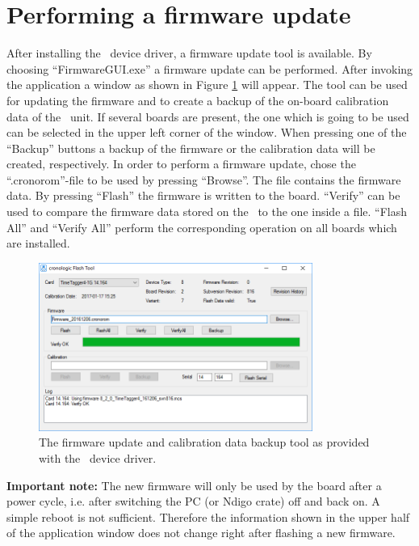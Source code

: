 	\section{Performing a firmware update}

		After installing the \deviceName\ device driver, a firmware update tool is available.
		 By choosing ``FirmwareGUI.exe'' a firmware update can be performed. 
		 After invoking the application a window as shown in Figure \ref{fig:Firmware} will appear. 
		 The tool can be used for updating the firmware and to create a backup of the on-board calibration data of the \deviceName\ unit. 
		 If several boards are present, the one which is going to be used can be selected in the upper left corner of the window. 
		 When pressing one of the ``Backup'' buttons a backup of the firmware or the calibration data will be created, respectively. 
		 In order to perform a firmware update, chose the ``.cronorom''-file to be used by pressing ``Browse''. 
		 The file contains the firmware data. By pressing ``Flash'' the firmware is written to the board. 
		 ``Verify'' can be used to compare the firmware data stored on the \deviceName\ to the one inside a file.
		 ``Flash All'' and ``Verify All'' perform the corresponding operation on all boards which are installed.\par

		\begin{figure}[ht]
			\begin{center}
				\includegraphics[width=0.8\textwidth]{figures/tt4_flashtool.png}
				\caption{\label{fig:Firmware}The firmware update and calibration data backup tool as provided with the \deviceName\ device driver.}
			\end{center}
		\end{figure}

\textbf{Important note:} The new firmware will only be used by the board after a power cycle, i.e. after switching the PC (or Ndigo crate) off and back on. 
A simple reboot is not sufficient. Therefore the information shown in the upper half of the application window does not change right after flashing a new firmware.
